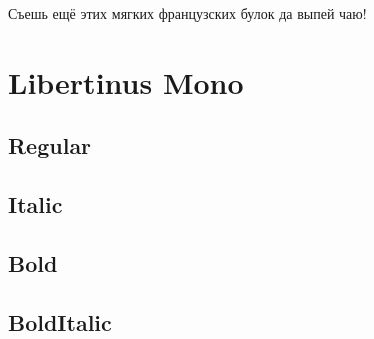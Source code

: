 \documentclass{article}
\begin{document}
{\ifxetex\else\ifluatex\else{}\selectfont\fi\fi
Съешь ещё этих мягких французских булок да
выпей чаю!}

\clearpage

\section{Libertinus Mono}

\ttfamily


\subsection*{Regular}
\lipsum[1]

\subsection*{Italic}
\textit{\lipsum[1]}

\subsection*{Bold}

\textbf{\lipsum[1]}

\subsection*{BoldItalic}


\textbf{\textit{{\lipsum[1]}}}
\end{document}

